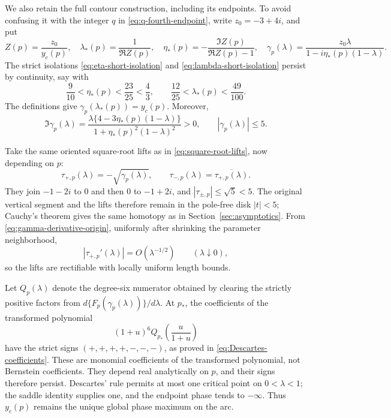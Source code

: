 \documentclass[11pt,reqno,letterpaper]{amsart}
\numberwithin{equation}{section}
\theoremstyle{definition}
\theoremstyle{remark}
\begin{document}
We also retain the full contour construction, including its endpoints.
To avoid confusing it with the integer \(q\) in
\eqref{eq:q-fourth-endpoint}, write \(z_0=-3+4i\), and put
\begin{equation}\label{eq:local-persistent-arc}
 Z(p)=\frac{z_0}{y_c(p)},\quad
 \lambda_*(p)=\frac1{\Re Z(p)},\quad
 \eta_*(p)=-\frac{\Im Z(p)}{\Re Z(p)-1},\quad
 \gamma_p(\lambda)=
 \frac{z_0\lambda}{1-i\eta_*(p)(1-\lambda)}.
\end{equation}
The strict isolations \eqref{eq:eta-short-isolation} and
\eqref{eq:lambda-short-isolation} persist by continuity, say with
\[
 \frac9{10}<\eta_*(p)<\frac{23}{25}<\frac43,\qquad
 \frac{12}{25}<\lambda_*(p)<\frac{49}{100}.
\]
The definitions give \(\gamma_p(\lambda_*(p))=y_c(p)\).  Moreover,
\begin{equation}\label{eq:local-persistent-arc-geometry}
 \Im\gamma_p(\lambda)=
 \frac{\lambda\{4-3\eta_*(p)(1-\lambda)\}}
 {1+\eta_*(p)^2(1-\lambda)^2}>0,\qquad
 |\gamma_p(\lambda)|\leq5.
\end{equation}

Take the same oriented square-root lifts as in
\eqref{eq:square-root-lifts}, now depending on \(p\):
\[
 \tau_{+,p}(\lambda)=-\sqrt{\gamma_p(\lambda)},\qquad
 \tau_{-,p}(\lambda)=\overline{\tau_{+,p}(\lambda)}.
\]
They join \(-1-2i\) to \(0\) and then \(0\) to \(-1+2i\), and
\(|\tau_{\pm,p}|\leq\sqrt5<5\).  The original vertical segment and the
lifts therefore remain in the pole-free disk \(|t|<5\); Cauchy's theorem
gives the same homotopy as in Section~\ref{sec:asymptotics}.  From
\eqref{eq:gamma-derivative-origin}, uniformly after shrinking the
parameter neighborhood,
\[
 |\tau_{+,p}'(\lambda)|=O(\lambda^{-1/2})
 \qquad(\lambda\downarrow0),
\]
so the lifts are rectifiable with locally uniform length bounds.

Let \(Q_p(\lambda)\) denote the degree-six numerator obtained by clearing
the strictly positive factors from
\(d\{F_p(\gamma_p(\lambda))\}/d\lambda\).  At \(p_*\), the coefficients
of the transformed polynomial
\begin{equation}\label{eq:local-descartes-transform}
 (1+u)^6Q_{p_*}\left(\frac{u}{1+u}\right)
\end{equation}
have the strict signs \((+,+,+,+,-,-,-)\), as proved in
\eqref{eq:Descartes-coefficients}.  These are monomial coefficients of
the transformed polynomial, not Bernstein coefficients.  They depend
real analytically on \(p\), and their signs therefore persist.  Descartes'
rule permits at most one critical point on \(0<\lambda<1\); the saddle
identity supplies one, and the endpoint phase tends to \(-\infty\).
Thus \(y_c(p)\) remains the unique global phase maximum on the arc.
\end{document}
